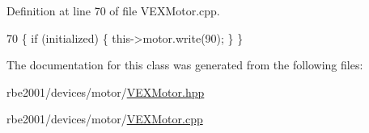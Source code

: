 Definition at line 70 of file V\+E\+X\+Motor.\+cpp.


\begin{DoxyCode}
70 \{ \textcolor{keywordflow}{if} (initialized) \{ this->motor.write(90); \} \}
\end{DoxyCode}


The documentation for this class was generated from the following files\+:\begin{DoxyCompactItemize}
\item 
rbe2001/devices/motor/\hyperlink{_v_e_x_motor_8hpp}{V\+E\+X\+Motor.\+hpp}\item 
rbe2001/devices/motor/\hyperlink{_v_e_x_motor_8cpp}{V\+E\+X\+Motor.\+cpp}\end{DoxyCompactItemize}
